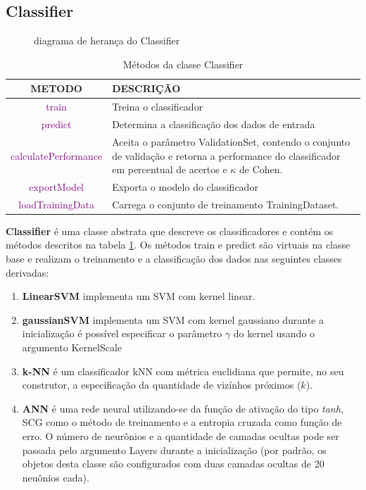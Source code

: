 \clearpage
\subsection{Classifier}
\begin{figure}[h!]
	\caption{diagrama de heran\c{c}a do Classifier}	
	\centering
	
	\label{fig:Classifier}
\end{figure}
\begin{table}[h!]
	\centering
	\caption{M\'etodos da classe Classifier}
	\begin{tabularx}{\textwidth}{c|X}
		
		\hline\hline
		METODO & DESCRI\c{C}\~AO \\ \hline 
		\textcolor{purple}{train} & Treina o classificador  \\ \hline
		\textcolor{purple}{predict} & Determina a classifica\c{c}\~ao dos dados de entrada \\ \hline
		\textcolor{purple}{calculatePerformance} & Aceita o par\^ametro ValidationSet, contendo o conjunto de valida\c{c}\~ao e retorna a performance do classificador em percentual de acertos e $\kappa$ de Cohen. \\ \hline
		\textcolor{purple}{exportModel} & Exporta o modelo do classificador \\ \hline
		\textcolor{purple}{loadTrainingData} & Carrega o conjunto de treinamento TrainingDataset.\\ \hline
	\end{tabularx}
	\label{Tab:metodosclass}
\end{table}
 \textbf{Classifier}  \'e uma classe abstrata que descreve os classificadores e cont\'em os m\'etodos descritos na tabela \ref{Tab:metodosclass}.
Os m\'etodos train e predict s\~ao virtuais na classe base e realizam o treinamento e a classifica\c{c}\~ao dos dados nas seguintes classes derivadas:
\begin{enumerate}
	\item \textbf{LinearSVM} implementa um \ac{SVM} com kernel linear.
	\item \textbf{gaussianSVM} implementa um \ac{SVM} com kernel gaussiano durante a inicializa\c{c}\~ao \'e poss\'ivel especificar o par\^ametro $\gamma$ do kernel usando o argumento KernelScale
	\item \textbf{k-NN} \'e um classificador \acs{kNN} com m\'etrica euclidiana que permite, no seu construtor, a especifica\c{c}\~ao da quantidade de viz\'inhos pr\'oximos ($k$).	  
	\item \textbf{ANN} \'e uma rede neural utilizando-se da fun\c{c}\~ao de ativa\c{c}\~ao do tipo \textit{tanh}, \ac{SCG} como o m\'etodo de treinamento e a entropia cruzada como fun\c{c}\~ao de erro. O n\'umero de neur\^onios e a quantidade de camadas ocultas pode ser passada pelo argumento Layers durante a inicializa\c{c}\~ao (por padr\~ao, os objetos desta classe s\~ao configurados com duas camadas ocultas de 20 neu\^onios cada).
\end{enumerate}
